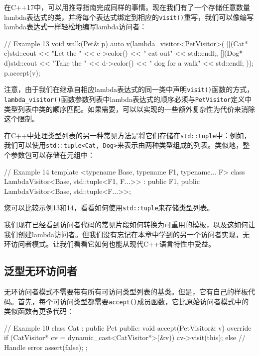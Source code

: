 \begin{code}
{在C++17中，可以用推导指南完成同样的事情。现在我们有了一个存储任意数量lambda表达式的类，并将每个表达式绑定到相应的\texttt{visit()}重写，我们可以像编写lambda表达式一样轻松地编写lambda访问者：

\begin{code}
// Example 13
void walk(Pet& p) {
  auto v(lambda_visitor<PetVisitor>(
  [](Cat* c){std::cout << "Let the " << c->color()
                         << " cat out" << std::endl;},
  [](Dog* d){std::cout << "Take the " << d->color()
                       << " dog for a walk" << std::endl;}
  ));
  p.accept(v);
}
\end{code}

注意，由于我们在继承自相应lambda表达式的同一类中声明\texttt{visit()}函数的方式，\texttt{lambda\_visitor()}函数参数列表中lambda表达式的顺序必须与\texttt{PetVisitor}定义中类型列表中类的顺序匹配。如果需要，可以以实现的一些额外复杂性为代价来消除这个限制。

在C++中处理类型列表的另一种常见方法是将它们存储在\texttt{std::tuple}中：例如，我们可以使用\texttt{std::tuple\textless{}Cat,\ Dog\textgreater{}}来表示由两种类型组成的列表。类似地，整个参数包可以存储在元组中：

\begin{code}
// Example 14
template <typename Base, typename F1, typename... F>
class LambdaVisitor<Base, std::tuple<F1, F...>> :
  public F1, public LambdaVisitor<Base, std::tuple<F...>>;
\end{code}

您可以比较示例13和14，看看如何使用\texttt{std::tuple}来存储类型列表。

我们现在已经看到访问者代码的常见片段如何转换为可重用的模板，以及这如何让我们创建lambda访问者。但我们没有忘记在本章中学到的另一个访问者实现，无环访问者模式。让我们看看它如何也能从现代C++语言特性中受益。

\subsection{泛型无环访问者}

无环访问者模式不需要带有所有可访问类型列表的基类。但是，它有自己的样板代码。首先，每个可访问类型都需要\texttt{accept()}成员函数，它比原始访问者模式中的类似函数有更多代码：

\begin{code}
// Example 10
class Cat : public Pet {
  public:
  void accept(PetVisitor& v) override {
    if (CatVisitor* cv = dynamic_cast<CatVisitor*>(&v)) {
      cv->visit(this);
    } else { // Handle error
      assert(false);
    }
  }
};
\end{code}

}
\end{code}
